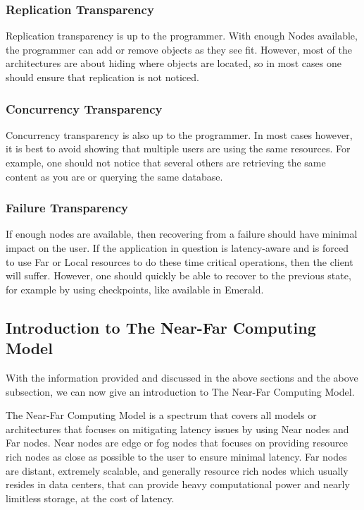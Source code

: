 \subsubsection{Replication Transparency}
Replication transparency is up to the programmer. With enough Nodes available, the programmer can add or remove objects as they see fit. However, most of the architectures are about hiding where objects are located, so in most cases one should ensure that replication is not noticed.

\subsubsection{Concurrency Transparency}
Concurrency transparency is also up to the programmer. In most cases however, it is best to avoid showing that multiple users are using the same resources. For example, one should not notice that several others are retrieving the same content as you are or querying the same database. 

\subsubsection{Failure Transparency}
If enough nodes are available, then recovering from a failure should have minimal impact on the user. If the application in question is latency-aware and is forced to use Far or Local resources to do these time critical operations, then the client will suffer. However, one should quickly be able to recover to the previous state, for example by using checkpoints, like available in Emerald.

\subsection{Introduction to The Near-Far Computing Model}
With the information provided and discussed in the above sections and the above subsection, we can now give an introduction to The Near-Far Computing Model.

The Near-Far Computing Model is a spectrum that covers all models or architectures that focuses on mitigating latency issues by using Near nodes and Far nodes. Near nodes are edge or fog nodes that focuses on providing resource rich nodes as close as possible to the user to ensure minimal latency. Far nodes are distant, extremely scalable, and generally resource rich nodes which usually resides in data centers, that can provide heavy computational power and nearly limitless storage, at the cost of latency.

